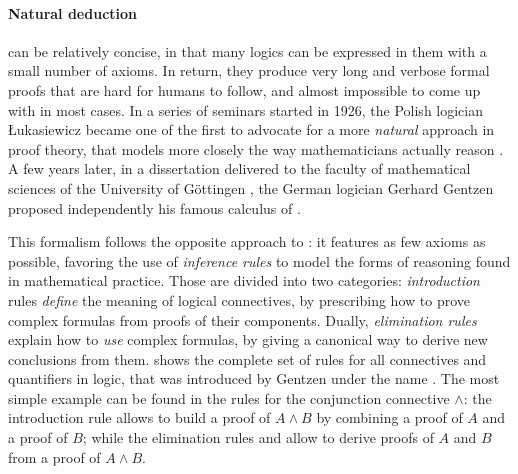 \paragraph{Natural deduction}

 can be relatively concise, in that many
logics can be expressed in them with a small number of axioms. In return, they
produce very long and verbose formal proofs that are hard for humans to follow,
and almost impossible to come up with in most cases. In a series of seminars
started in 1926, the Polish logician Łukasiewicz became one of the first to
advocate for a more \emph{natural} approach in proof theory, that models more
closely the way mathematicians actually reason
. A few years later, in a dissertation
delivered to the faculty of mathematical sciences of the University of Göttingen
, the German logician Gerhard Gentzen
proposed independently his famous calculus of .

This formalism follows the opposite approach to : it
features as few axioms as possible, favoring the use of \emph{inference rules}
to model the forms of reasoning found in mathematical practice. Those are
divided into two categories: \emph{introduction} rules \emph{define} the meaning
of logical connectives, by prescribing how to prove complex formulas from proofs
of their components. Dually, \emph{elimination rules} explain how to \emph{use}
complex formulas, by giving a canonical way to derive new conclusions from them.
 shows the complete set of  rules for all
connectives and quantifiers in  logic, that was introduced by
Gentzen under the name  \cite{gentzen_untersuchungen_1935}. The most simple example can be
found in the rules for the conjunction connective $\land$: the introduction rule
 allows to build a proof of $A \land B$ by combining a proof of $A$
and a proof of $B$; while the elimination rules  and  allow to derive proofs of $A$ and $B$ from a proof of $A \land B$.

